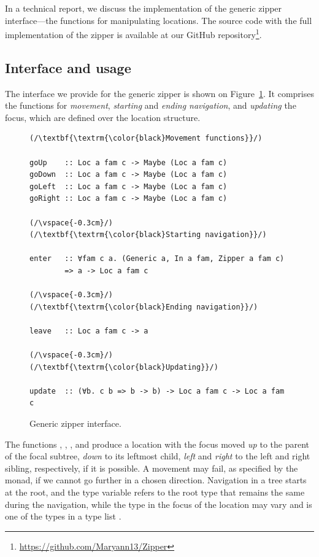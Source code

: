 \documentclass[sigplan,screen,review,anonymous]{acmart}
\begin{document}
In a technical report, we discuss the implementation of the generic zipper interface---the functions for manipulating locations. The source code with the full implementation of the zipper is available at our \textsf{GitHub} repository\footnote{\url{https://github.com/Maryann13/Zipper}}.

\subsection{Interface and usage}
\label{ss:zip-interface}

The interface we provide for the generic zipper is shown on Figure~\ref{fig:zipper-interface}. It comprises the functions for \emph{movement}, \emph{starting} and \emph{ending navigation}, and \emph{updating} the focus, which are defined over the location structure.
\begin{figure}[t]
\begin{CenteredBox}
{\lset
\begin{lstlisting}[style=fancy]
(/\textbf{\textrm{\color{black}Movement functions}}/)

goUp    :: Loc a fam c -> Maybe (Loc a fam c)
goDown  :: Loc a fam c -> Maybe (Loc a fam c)
goLeft  :: Loc a fam c -> Maybe (Loc a fam c)
goRight :: Loc a fam c -> Maybe (Loc a fam c)

(/\vspace{-0.3cm}/)
(/\textbf{\textrm{\color{black}Starting navigation}}/)

enter   :: ∀fam c a. (Generic a, In a fam, Zipper a fam c)
        => a -> Loc a fam c

(/\vspace{-0.3cm}/)
(/\textbf{\textrm{\color{black}Ending navigation}}/)

leave   :: Loc a fam c -> a

(/\vspace{-0.3cm}/)
(/\textbf{\textrm{\color{black}Updating}}/)

update  :: (∀b. c b => b -> b) -> Loc a fam c -> Loc a fam c
\end{lstlisting}}
\end{CenteredBox}
\caption{Generic zipper interface.}
\label{fig:zipper-interface}
\end{figure}

The functions , , , and  produce a location with the focus moved \emph{up} to the parent of the focal subtree, \emph{down} to its leftmost child, \emph{left} and \emph{right} to the left and right sibling, respectively, if it is possible. A movement may fail, as specified by the  monad, if we cannot go further in a chosen direction. Navigation in a tree starts at the root, and the type variable  refers to the root type that remains the same during the navigation, while the type in the focus of the location may vary and is one of the types in a type list .
\end{document}
